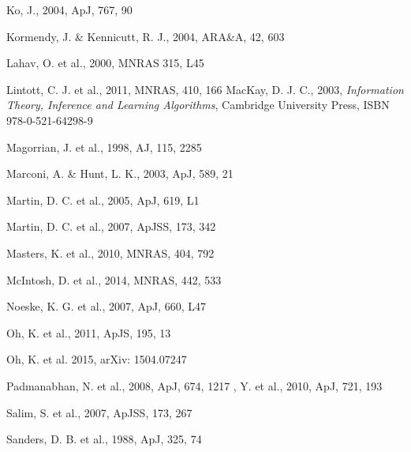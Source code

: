 \documentclass[useAMS,usenatbib]{mn2e}
\begin{document}
\begin{thebibliography}{}
 Ko, J., 2004, ApJ, 767, 90

 Kormendy, J. \& Kennicutt, R. J., 2004, ARA\&A, 42, 603

 Lahav, O. et al., 2000, MNRAS 315, L45

 Lintott, C. J. et al., 2011, MNRAS, 410, 166
 MacKay, D. J. C., 2003, \emph{Information Theory, Inference and Learning Algorithms}, Cambridge University Press, ISBN 978-0-521-64298-9

 Magorrian, J. et al., 1998, AJ, 115, 2285

 Marconi, A. \& Hunt, L. K., 2003, ApJ, 589, 21

 Martin, D. C. et al., 2005, ApJ, 619, L1


 Martin, D. C. et al., 2007, ApJSS, 173, 342

 Masters, K. et al., 2010, MNRAS, 404, 792

 McIntosh, D. et al., 2014, MNRAS, 442, 533

 Noeske, K. G. et al., 2007, ApJ, 660, L47


 Oh, K. et al., 2011, ApJS, 195, 13

 Oh, K. et al. 2015, arXiv: 1504.07247

 Padmanabhan, N. et al., 2008, ApJ, 674, 1217
 , Y. et al., 2010, ApJ, 721, 193

 Salim, S. et al., 2007, ApJSS, 173, 267

 Sanders, D. B. et al., 1988, ApJ, 325, 74


\end{thebibliography}
\end{document}
